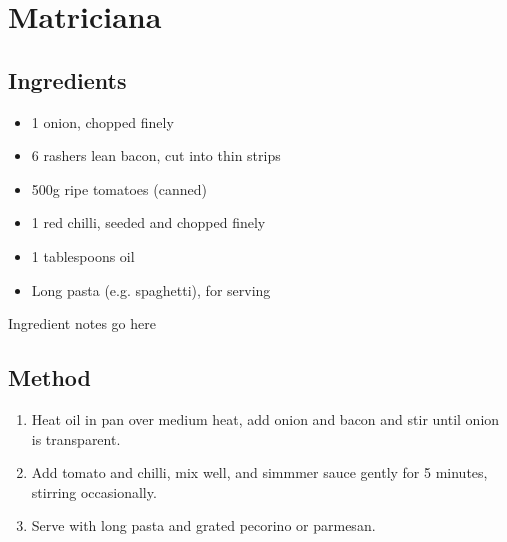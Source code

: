 \section{Matriciana}


\subsection{Ingredients}

\begin{itemize}
    \item 1 onion, chopped finely
    \item 6 rashers lean bacon, cut into thin strips
    \item 500g ripe tomatoes (canned)
    \item 1 red chilli, seeded and chopped finely
    \item 1 tablespoons oil
    \item Long pasta (e.g. spaghetti), for serving
\end{itemize}

Ingredient notes go here

\subsection{Method}

\begin{enumerate}
    \item Heat oil in pan over medium heat, add onion and bacon and stir until onion is transparent.
    \item Add tomato and chilli, mix well, and simmmer sauce gently for 5 minutes, stirring occasionally.
    \item Serve with long pasta and grated pecorino or parmesan.
\end{enumerate}
